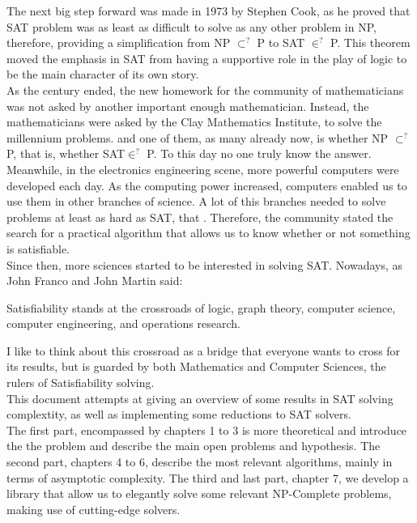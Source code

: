 The next big step forward was made in 1973 by Stephen Cook, as he proved that SAT problem was as least as difficult to solve as any other problem in NP, therefore, providing a simplification from NP $\subset^?$ P to  SAT $\in^? $ P. This theorem moved the emphasis in SAT from having a supportive role in the play of logic to be the main character of its own story.\\

As the century ended, the new homework for the community of mathematicians was not asked by another important enough mathematician. Instead, the mathematicians  were asked by the Clay Mathematics Institute, to solve the millennium problems. and one of them, as many already now, is whether NP $\subset^?$ P, that is, whether SAT$\in^?$ P. To this day no one truly know the answer. \\

Meanwhile, in the electronics engineering scene, more powerful computers were developed each day. As the computing power increased, computers enabled us to use them in other branches of science. A lot of this branches needed to solve problems at least as hard as SAT, that . Therefore, the community stated the search for a practical algorithm that  allows us to know whether or not something is satisfiable.\\


Since then, more sciences started to be interested in solving SAT. Nowadays, as John Franco and John Martin said:
\begin{quoting}
Satisfiability stands at the crossroads of logic, graph theory, computer science, computer engineering, and operations research.
\end{quoting}

I like to think about this crossroad as a bridge that everyone wants to cross for its results, but is guarded by both Mathematics and Computer Sciences, the rulers of Satisfiability solving.\\

This document attempts at giving an overview of some results in SAT solving complextity, as well as implementing some reductions to SAT solvers. \\

The first part, encompassed by chapters 1 to 3 is more theoretical and introduce the  the problem and describe the main open problems and hypothesis.
The second part, chapters 4 to 6, describe the most relevant algorithms, mainly in terms of asymptotic complexity. The third and  last part, chapter 7, we develop a library that allow us to elegantly solve some relevant NP-Complete problems, making use of cutting-edge solvers.\\


